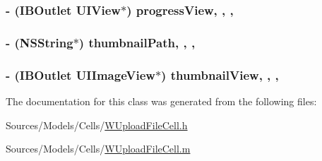 \hypertarget{interface_w_upload_file_cell_aeb2e8068ff8c8de4ad2ad79e6278c339}{
\subsubsection[{progress\-View}]{\setlength{\rightskip}{0pt plus 5cm}-\/ (I\-B\-Outlet U\-I\-View$\ast$) progress\-View\hspace{0.3cm}{\ttfamily [read]}, {\ttfamily [write]}, {\ttfamily [nonatomic]}, {\ttfamily [retain]}}}\label{interface_w_upload_file_cell_aeb2e8068ff8c8de4ad2ad79e6278c339}
\hypertarget{interface_w_upload_file_cell_a1307d58613ef20d607a04c4a5d421aca}{
\subsubsection[{thumbnail\-Path}]{\setlength{\rightskip}{0pt plus 5cm}-\/ (N\-S\-String$\ast$) thumbnail\-Path\hspace{0.3cm}{\ttfamily [read]}, {\ttfamily [write]}, {\ttfamily [nonatomic]}, {\ttfamily [retain]}}}\label{interface_w_upload_file_cell_a1307d58613ef20d607a04c4a5d421aca}
\hypertarget{interface_w_upload_file_cell_a15a832bb919591e9535ca755d16fa973}{
\subsubsection[{thumbnail\-View}]{\setlength{\rightskip}{0pt plus 5cm}-\/ (I\-B\-Outlet U\-I\-Image\-View$\ast$) thumbnail\-View\hspace{0.3cm}{\ttfamily [read]}, {\ttfamily [write]}, {\ttfamily [nonatomic]}, {\ttfamily [retain]}}}\label{interface_w_upload_file_cell_a15a832bb919591e9535ca755d16fa973}


The documentation for this class was generated from the following files\-:\begin{DoxyCompactItemize}
\item 
Sources/\-Models/\-Cells/\hyperlink{_w_upload_file_cell_8h}{W\-Upload\-File\-Cell.\-h}\item 
Sources/\-Models/\-Cells/\hyperlink{_w_upload_file_cell_8m}{W\-Upload\-File\-Cell.\-m}\end{DoxyCompactItemize}
